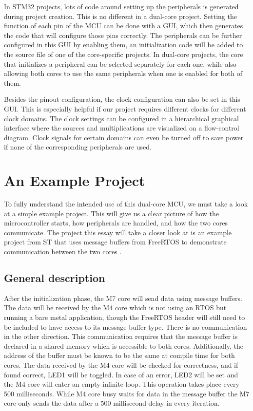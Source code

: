 In STM32 projects, lots of code around setting up the peripherals is generated during project creation. This is no different in a dual-core project. Setting the function of each pin of the MCU can be done with a GUI, which then generates the code that will configure those pins correctly. The peripherals can be further configured in this GUI by enabling them, an initialization code will be added to the  source file of one of the core-specific projects. In dual-core projects, the core that initializes a peripheral can be selected separately for each one, while also allowing both cores to use the same peripherals when one is enabled for both of them.

Besides the pinout configuration, the clock configuration can also be set in this GUI. This is especially helpful if our project requires different clocks for different clock domains. The clock settings can be configured in a hierarchical graphical interface where the sources and multiplications are visualized on a flow-control diagram. Clock signals for certain domains can even be turned off to save power if none of the corresponding peripherals are used.

\section{An Example Project}

To fully understand the intended use of this dual-core MCU, we must take a look at a simple example project. This will give us a clear picture of how the microcontroller starts, how peripherals are handled, and how the two cores communicate. The project this essay will take a closer look at is an example project from ST that uses message buffers from FreeRTOS to demonstrate communication between the two cores \cite{CDemo}.

\subsection{General description}

After the initialization phase, the M7 core will send data using message buffers. The data will be received by the M4 core which is not using an RTOS but running a bare metal application, though the FreeRTOS header will still need to be included to have access to its message buffer type. There is no communication in the other direction. This communication requires that the message buffer is declared in a shared memory which is accessible to both cores. Additionally, the address of the buffer must be known to be the same at compile time for both cores. The data received by the M4 core will be checked for correctness, and if found correct, LED1 will be toggled. In case of an error, LED2 will be set and the M4 core will enter an empty infinite loop. This operation takes place every 500 milliseconds. While M4 core busy waits for data in the message buffer the M7 core only sends the data after a 500 millisecond delay in every iteration.

